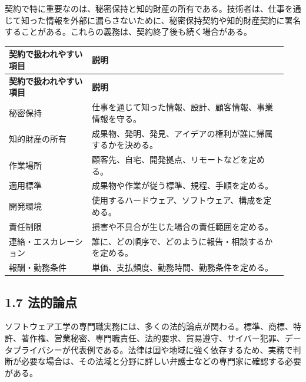 \documentclass[uplatex,dvipdfmx,a4paper,11pt]{jsarticle}
\begin{document}
契約で特に重要なのは、秘密保持と知的財産の所有である。技術者は、仕事を通じて知った情報を外部に漏らさないために、秘密保持契約や知的財産契約に署名することがある。これらの義務は、契約終了後も続く場合がある。

\begin{center}
\small
\begin{longtable}{p{0.28\linewidth}p{0.66\linewidth}}
\toprule
\textbf{契約で扱われやすい項目} & \textbf{説明} \\
\midrule
\endfirsthead
\toprule
\textbf{契約で扱われやすい項目} & \textbf{説明} \\
\midrule
\endhead
秘密保持 & 仕事を通じて知った情報、設計、顧客情報、事業情報を守る。 \\
\midrule
知的財産の所有 & 成果物、発明、発見、アイデアの権利が誰に帰属するかを決める。 \\
\midrule
作業場所 & 顧客先、自宅、開発拠点、リモートなどを定める。 \\
\midrule
適用標準 & 成果物や作業が従う標準、規程、手順を定める。 \\
\midrule
開発環境 & 使用するハードウェア、ソフトウェア、構成を定める。 \\
\midrule
責任制限 & 損害や不具合が生じた場合の責任範囲を定める。 \\
\midrule
連絡・エスカレーション & 誰に、どの順序で、どのように報告・相談するかを定める。 \\
\midrule
報酬・勤務条件 & 単価、支払頻度、勤務時間、勤務条件を定める。 \\
\midrule
\bottomrule
\end{longtable}
\normalsize
\end{center}

\subsection*{1.7 法的論点}


ソフトウェア工学の専門職実務には、多くの法的論点が関わる。標準、商標、特許、著作権、営業秘密、専門職責任、法的要求、貿易遵守、サイバー犯罪、データプライバシーが代表例である。法律は国や地域に強く依存するため、実務で判断が必要な場合は、その法域と分野に詳しい弁護士などの専門家に確認する必要がある。

\begin{center}
\end{center}
\end{document}
